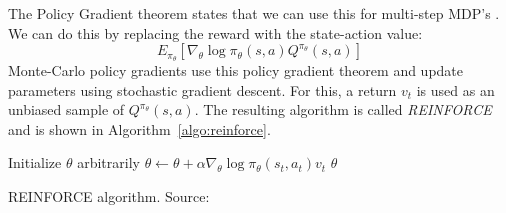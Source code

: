 \documentclass[a4paper, 11pt]{article}
\begin{document}
The Policy Gradient theorem states that we can use this for multi-step MDP's \citep{Sutton1999PolicyApproximation}. We can do this by replacing the reward with the state-action value:
\begin{equation}
E_{\pi_{\theta}} [\nabla_{\theta} \log \pi_{\theta}(s,a)Q^{\pi_{\theta}}(s,a)]
\end{equation}
Monte-Carlo policy gradients use this policy gradient theorem and update parameters using stochastic gradient descent. For this, a return $v_t$ is used as an unbiased sample of $Q^{\pi_{\theta}}(s,a)$. The resulting algorithm is called \textit{REINFORCE} \citep{williams1992simple} and is shown in Algorithm~\ref{algo:reinforce}.\\
\begin{algorithm}[htb]
\DontPrintSemicolon
Initialize $\theta$ arbitrarily\;
 {
	 {
    	$\theta \gets \theta + \alpha \nabla_{\theta} \log \pi_{\theta}(s_t,a_t)v_t$
    }
}
\Return $\theta$
\caption[REINFORCE]{REINFORCE algorithm. Source: \cite{Sutton1998ReinforcementIntroduction}}
\label{algo:reinforce}
\end{algorithm}
\end{document}
